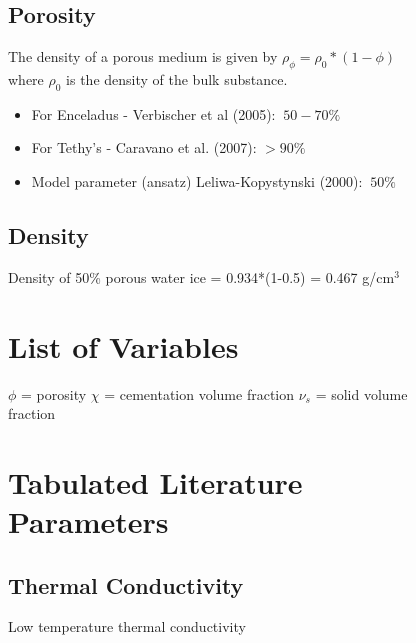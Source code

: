 \documentclass[11pt]{article} %
\begin{document}
\begin{figure}[ht]
\begin{Table}
\begin{Comment}
\subsection{Porosity}
\label{sec:porosity}

	The density of a porous medium is given by $\rho_{\phi} = \rho_{0}*(1-\phi)$ where $\rho_{0}$ is the density of the bulk substance. 

	\begin{itemize}
	\item For Enceladus - Verbischer et al (2005): $~50-70\%$
	\item For Tethy's - Caravano et al. (2007): $>90\%$ 
	\item Model parameter (ansatz) Leliwa-Kopystynski (2000): $~50\%$
	\end{itemize}
	
\subsection{Density}
	Density of 50\% porous water ice = 0.934*(1-0.5) = 0.467 g/cm$^{3}$
	
\section{List of Variables}
$\phi$ = porosity
$\chi$ = cementation volume fraction
$\nu_{s}$ = solid volume fraction

\section{Tabulated Literature Parameters}
\label{sec:tabulated}
	
\subsection{Thermal Conductivity}
\label{sec:tconductivity}
	
	Low temperature thermal conductivity
	

\end{Comment}
\end{Table}
\end{figure}
\end{document}

